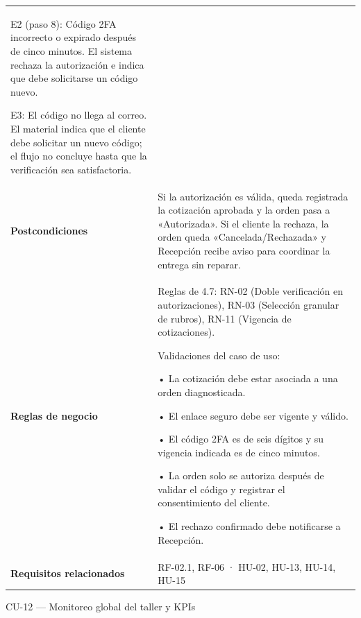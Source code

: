 {\begin{longtable}[]{@{}
  >{\raggedright\arraybackslash}p{}
  >{\raggedright\arraybackslash}p{}@{}}
E2 (paso 8): Código 2FA incorrecto o expirado después de cinco minutos.
El sistema rechaza la autorización e indica que debe solicitarse un
código nuevo.

E3: El código no llega al correo. El material indica que el cliente debe
solicitar un nuevo código; el flujo no concluye hasta que la
verificación sea satisfactoria. \\
\textbf{Postcondiciones} & Si la autorización es válida, queda
registrada la cotización aprobada y la orden pasa a «Autorizada». Si el
cliente la rechaza, la orden queda «Cancelada/Rechazada» y Recepción
recibe aviso para coordinar la entrega sin reparar. \\
\textbf{Reglas de negocio} & Reglas de 4.7: RN-02 (Doble verificación en
autorizaciones), RN-03 (Selección granular de rubros), RN-11 (Vigencia
de cotizaciones).

Validaciones del caso de uso:

• La cotización debe estar asociada a una orden diagnosticada.

• El enlace seguro debe ser vigente y válido.

• El código 2FA es de seis dígitos y su vigencia indicada es de cinco
minutos.

• La orden solo se autoriza después de validar el código y registrar el
consentimiento del cliente.

• El rechazo confirmado debe notificarse a Recepción. \\
\textbf{Requisitos relacionados} & RF-02.1, RF-06 · HU-02, HU-13, HU-14,
HU-15 \\
\end{longtable}
}

CU-12 --- Monitoreo global del taller y KPIs

